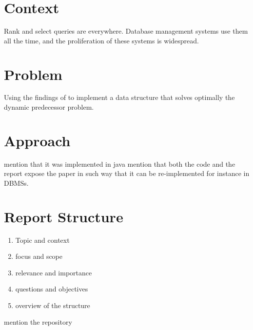 
\section{Context}

Rank and select queries are everywhere. Database management systems use them all the time, and the proliferation of these systems is widespread. 

\section{Problem}

Using the findings of \cite{patrascu2014dynamic} to implement a data structure that solves optimally the dynamic predecessor problem.

\section{Approach}

mention that it was implemented in java
mention that both the code and the report expose the paper in such way that it can be re-implemented for instance in DBMSs.

\section{Report Structure}

\begin{enumerate}
    \item
    Topic and context
    \item
    focus and scope
    \item
    relevance and importance
    \item
    questions and objectives
    \item
    overview of the structure
\end{enumerate}


mention the repository

